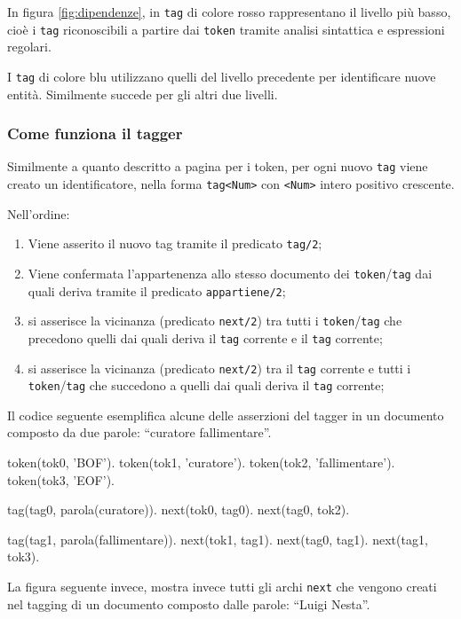 In figura \ref{fig:dipendenze}, in \verb|tag| di colore rosso rappresentano il livello più basso, cioè i \verb|tag| riconoscibili a partire dai \verb|token| tramite analisi sintattica e espressioni regolari.

I \verb|tag| di colore blu utilizzano quelli del livello precedente per identificare nuove entità. Similmente succede per gli altri due livelli.

\subsubsection{Come funziona il tagger}

Similmente a quanto descritto a pagina \pageref{sec:creazionetoken} per i token, per ogni nuovo \verb|tag| viene creato un identificatore, nella forma \verb:tag<Num>: con \verb+<Num>+ intero positivo crescente.

Nell'ordine:
\begin{enumerate}
\item Viene asserito il nuovo tag tramite il predicato \verb|tag/2|;
\item Viene confermata l'appartenenza allo stesso documento dei \verb|token|/\verb|tag| dai quali deriva tramite il predicato \verb|appartiene/2|;
\item si asserisce la vicinanza (predicato \verb|next/2|) tra tutti i \verb|token|/\verb|tag| che precedono quelli dai quali deriva il \verb|tag| corrente e il \verb|tag| corrente;
\item si asserisce la vicinanza (predicato \verb|next/2|) tra il \verb|tag| corrente e tutti i \verb|token|/\verb|tag| che succedono a quelli dai quali deriva il \verb|tag| corrente;
\end{enumerate} 

Il codice seguente esemplifica alcune delle asserzioni del tagger in un documento composto da due parole: ``curatore fallimentare''.

\begin{prologcode}
token(tok0, 'BOF').
token(tok1, 'curatore').
token(tok2, 'fallimentare').
token(tok3, 'EOF').

tag(tag0, parola(curatore)).
next(tok0, tag0).
next(tag0, tok2).

tag(tag1, parola(fallimentare)).
next(tok1, tag1).
next(tag0, tag1).
next(tag1, tok3).
\end{prologcode}

La figura seguente invece, mostra invece tutti gli archi \verb|next| che vengono creati nel tagging di un documento composto dalle parole: ``Luigi Nesta''.

